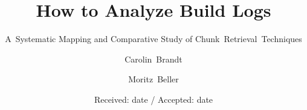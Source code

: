\newcommand{\todo}[1] {{\bfseries \color{todo} #1}}
\newcommand{\caro}[1] {\todo{[Caro: #1]} } 


%
%
%


\title{How to Analyze Build Logs%
}
\subtitle{A~Systematic Mapping and Comparative Study of Chunk~Retrieval~Techniques}


\author{Carolin~Brandt        \and
        Moritz~Beller %
}



\date{Received: date / Accepted: date}


\maketitle

